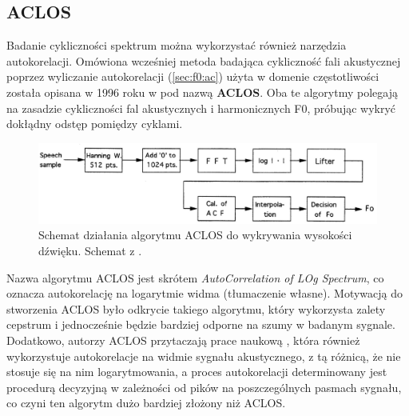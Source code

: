 \documentclass[12pt,a4paper,twoside]{mwart}
\begin{document}
\subsection{ACLOS}\label{sec:f0:aclos}
Badanie cykliczności spektrum można wykorzystać również narzędzia autokorelacji. Omówiona wcześniej metoda badająca cykliczność fali akustycznej poprzez wyliczanie autokorelacji (\ref{sec:f0:ac}) użyta w domenie częstotliwości została opisana w 1996 roku w \cite{Transcription:Kunieda:Aclos} pod nazwą \textbf{ACLOS}. Oba te algorytmy polegają na zasadzie cykliczności fal akustycznych i harmonicznych F0, próbując wykryć dokłądny odstęp pomiędzy cyklami.

\begin{figure}[H]
  \begin{center}
    \includegraphics[scale=0.29]{images/ACLOS/ACLOS_flow.jpg}
    \caption{Schemat działania algorytmu ACLOS do wykrywania wysokości dźwięku. Schemat z \cite[233]{Transcription:Kunieda:Aclos}.}
    \label{fig:aclos:flow}
  \end{center}
\end{figure}

Nazwa algorytmu ACLOS jest skrótem \textit{AutoCorrelation of LOg Spectrum}, co oznacza autokorelację na logarytmie widma (tłumaczenie własne). Motywacją do stworzenia ACLOS było odkrycie takiego algorytmu, który wykorzysta zalety cepstrum i jednocześnie będzie bardziej odporne na szumy w badanym sygnale. Dodatkowo, autorzy ACLOS przytaczają prace naukową \cite{Transcription:Lahat:SpectralAutocorrelationNoiseCorrupted}, która również wykorzystuje autokorelacje na widmie sygnału akustycznego, z tą różnicą, że nie stosuje się na nim logarytmowania, a proces autokorelacji determinowany jest procedurą decyzyjną w zależności od pików na poszczególnych pasmach sygnału, co czyni ten algorytm dużo bardziej złożony niż ACLOS.
\end{document}

